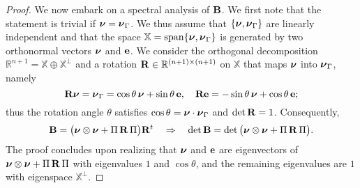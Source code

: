 \begin{proof}
We now embark on a spectral analysis of ${\bf B}$.
We first note that the statement is trivial if ${\boldsymbol \nu}={\boldsymbol \nu}_\Gamma$. We thus
assume that $\{{\boldsymbol \nu},{\boldsymbol \nu}_\Gamma\}$ are linearly independent and that the
space $\mathbb{X} = \textrm{span} \{{\boldsymbol \nu},{\boldsymbol \nu}_\Gamma\}$
is generated by two orthonormal vectors ${\boldsymbol \nu}$ and ${\bf e}$. 
We consider the orthogonal decomposition
$\mathbb{R}^{n+1} = \mathbb{X} \oplus \mathbb{X}^\perp$ and
a rotation ${\bf R}\in\mathbb{R}^{(n+1)\times(n+1)}$ on $\mathbb{X}$
that maps ${\boldsymbol \nu}$ into ${\boldsymbol \nu}_\Gamma$, namely
%
\[
{\bf R} {\boldsymbol \nu} = {\boldsymbol \nu}_\Gamma = \cos \theta \, {\boldsymbol \nu} + \sin\theta \, {\bf e},
\quad
{\bf R} {\bf e} = -\sin\theta \, {\boldsymbol \nu} + \cos \theta \, {\bf e};
\]
%
thus the rotation angle $\theta$ satisfies $\cos\theta={\boldsymbol \nu} \cdot {\boldsymbol \nu}_\Gamma$
and $\det{\bf R}=1$. Consequently,
%
\[
{\bf B} = \big( {\boldsymbol \nu}\otimes{\boldsymbol \nu} + \Pi \, {\bf R} \, \Pi  \big) {\bf R}^t
\quad\Rightarrow\quad
\det {\bf B} = \det \big( {\boldsymbol \nu}\otimes{\boldsymbol \nu} + \Pi \, {\bf R} \, \Pi  \big).
\]
%
The proof concludes upon realizing that ${\boldsymbol \nu}$ and ${\bf e}$ are
eigenvectors of ${\boldsymbol \nu}\otimes{\boldsymbol \nu} + \Pi \, {\bf R} \, \Pi$ 
with eigenvalues $1$ and $\cos\theta$, and the remaining eigenvalues are $1$
with eigenspace $\mathbb{X}^\perp$.
\end{proof}

